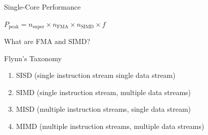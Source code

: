 \documentclass[10pt]{beamer}
\begin{document}


\begin{frame}{Single-Core Performance}

$P_{\text{peak}} = n_{\text{super}}  \times n_{\text{FMA}} \times n_{\text{SIMD}} \times f$

\vfill 

What are FMA and SIMD?

\end{frame}





\begin{frame}{Flynn's Taxonomy}

\begin{enumerate}
 \item SISD (single instruction stream single data stream)
 \item SIMD (single instruction stream, multiple data streams)
 \item MISD (multiple instruction streams, single data stream)
 \item MIMD (multiple instruction streams, multiple data streams)
\end{enumerate}


\end{frame}
\end{document}
